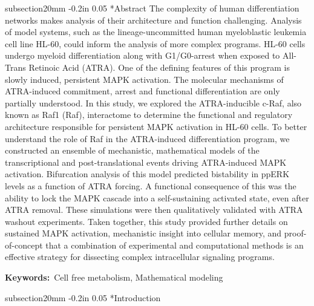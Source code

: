 \documentclass[12pt]{article}
\makeatletter
\renewcommand\section{\@startsection
	{subsection}{2}{0mm}
	{-0.2in}
	{0.05\baselineskip}
	{\normalfont\large\bfseries}}
\makeatother
\begin{document}
\section*{Abstract}
The complexity of human differentiation networks makes analysis of their architecture and function challenging.  
Analysis of model systems, such as the lineage-uncommitted human myeloblastic leukemia cell line HL-60, 
could inform the analysis of more complex programs. 
HL-60 cells undergo myeloid differentiation along with G1/G0-arrest when exposed to All-Trans Retinoic Acid (ATRA). 
One of the defining features of this program is slowly induced, persistent MAPK activation.
The molecular mechanisms of ATRA-induced commitment, arrest and functional differentiation are only partially understood.
In this study, we explored the ATRA-inducible c-Raf, also known as Raf1 (Raf), 
interactome to determine the functional and regulatory architecture responsible for persistent MAPK activation in HL-60 cells. 
To better understand the role of Raf in the ATRA-induced differentiation program, 
we constructed an ensemble of mechanistic, mathematical models of the transcriptional and post-translational events driving ATRA-induced MAPK activation. 
Bifurcation analysis of this model predicted bistability in ppERK levels as a function of ATRA forcing. 
A functional consequence of this was the ability to lock the MAPK cascade into a self-sustaining activated state, even after ATRA removal.
These simulations were then qualitatively validated with ATRA washout experiments. 
Taken together, this study provided further details on sustained MAPK activation, mechanistic insight into cellular memory,
and proof-of-concept that a
combination of experimental and computational methods is an effective strategy for dissecting complex intracellular signaling programs.


{\noindent \textbf{Keywords:}~Cell free metabolism, Mathematical modeling}

\pagebreak

\setcounter{page}{1}

\linenumbers

\section*{Introduction}
\end{document}

